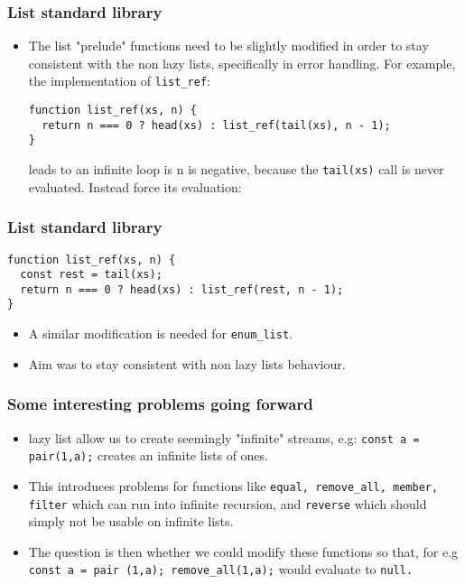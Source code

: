 \documentclass[12pt]{beamer}
\begin{document}
\begin{frame}[fragile]
\frametitle{List standard library}
\begin{itemize}
\item<1->The list "prelude" functions need to be slightly modified in order to stay consistent with the non lazy lists, specifically in error handling. For example, the implementation of \texttt{list\_ref}:
\begin{lstlisting}
function list_ref(xs, n) {
  return n === 0 ? head(xs) : list_ref(tail(xs), n - 1);
}
\end{lstlisting}
leads to an infinite loop is n is negative, because the \texttt{tail(xs)} call is never evaluated.
Instead force its evaluation:

\end{itemize}
\end{frame}

\begin{frame}[fragile]
\frametitle{List standard library}
\begin{lstlisting}
function list_ref(xs, n) {
  const rest = tail(xs);
  return n === 0 ? head(xs) : list_ref(rest, n - 1);
}
\end{lstlisting}
\begin{itemize}
    \item <1-> A similar modification is needed for \texttt{enum\_list}.
    \item <2-> Aim was to stay consistent with non lazy lists behaviour. 
\end{itemize}
\end{frame}

\begin{frame}
\frametitle{Some interesting problems going forward}
\begin{itemize}
    \item lazy list allow us to create seemingly "infinite" streams, e.g: \texttt{const a = pair(1,a);} creates an infinite lists of ones.
    \item <2-> This introduces problems for functions like \texttt{equal, remove\_all, member, filter} which can run into infinite recursion, and \texttt{reverse} which should simply not be usable on infinite lists.
    \item<3-> The question is then whether we could modify these functions so that, for e.g \break \texttt{const a = pair (1,a); remove\_all(1,a);} would evaluate to \texttt{null.}
\end{itemize}
\end{frame}
\end{document}

